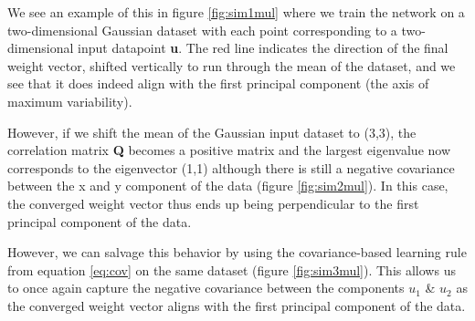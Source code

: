 \documentclass{article}
\begin{document}
We see an example of this in figure \ref{fig:sim1mul} where we train the network on a two-dimensional Gaussian dataset with each point corresponding to a two-dimensional input datapoint \textbf{u}. The red line indicates the direction of the final weight vector, shifted vertically to run through the mean of the dataset, and we see that it does indeed align with the first principal component (the axis of maximum variability).

However, if we shift the mean of the Gaussian input dataset to (3,3), the correlation matrix \textbf{Q} becomes a positive matrix and the largest eigenvalue now corresponds to the eigenvector (1,1) although there is still a negative covariance between the x and y component of the data (figure \ref{fig:sim2mul}). In this case, the converged weight vector thus ends up being perpendicular to the first principal component of the data.

However, we can salvage this behavior by using the covariance-based learning rule from equation \ref{eq:cov} on the same dataset (figure \ref{fig:sim3mul}). This allows us to once again capture the negative covariance between the components $u_1$ \& $u_2$ as the converged weight vector aligns with the first principal component of the data.
\end{document}
